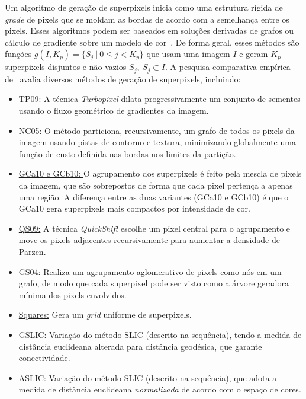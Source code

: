 Um algoritmo de geração de superpixels inicia como uma estrutura rígida de \textit{grade} de pixels que se moldam as bordas de acordo com a semelhança entre os pixels.
Esses algoritmos podem ser baseados em soluções derivadas de grafos ou cálculo de gradiente sobre um modelo de cor~\cite{Felzenszwalb2004,Vedaldi2008}.
De forma geral, esses métodos são funções $g(I, K_p) = \{S_j ~|~ 0 \leq j < K_p\}$ que usam uma imagem $I$ e geram $K_p$ superpixels disjuntos e não-vazios $S_j, ~S_j \subset I$.
A pesquisa comparativa empírica de~ avalia diversos métodos de geração de superpixels, incluindo:

\begin{itemize}
    
    \item \underline{TP09:} A técnica \textit{Turbopixel} dilata progressivamente um conjunto de sementes usando o fluxo geométrico de gradientes da imagem.
    
    \item \underline{NC05:} O método particiona, recursivamente, um grafo de todos os pixels da imagem usando pistas de contorno e textura, minimizando globalmente uma função de custo definida nas bordas nos limites da partição.
    
    \item \underline{GCa10 e GCb10: } O agrupamento dos superpixels é feito pela mescla de pixels da imagem, que são sobrepostos de forma que cada pixel pertença a apenas uma região. 
    A diferença entre as duas variantes (GCa10 e GCb10) é que o GCa10 gera superpixels mais compactos por intensidade de cor.
    
    \item \underline{QS09:} A técnica \textit{QuickShift} escolhe um pixel central para o agrupamento e move os pixels adjacentes recursivamente para aumentar a densidade de Parzen.
    
    \item \underline{GS04:} Realiza um agrupamento aglomerativo de pixels como nós em um grafo, de modo que cada superpixel pode ser visto como a árvore geradora mínima dos pixels envolvidos.
    
    \item \underline{Squares:} Gera um \textit{grid} uniforme de superpixels.
    
    \item \underline{GSLIC:} Variação do método SLIC (descrito na sequência), tendo a medida de distância euclideana alterada para distância geodésica, que garante conectividade.
    
    \item \underline{ASLIC:} Variação do método SLIC (descrito na sequência), que adota a medida de distância euclideana \textit{normalizada} de acordo com o espaço de cores.
    
\end{itemize}


